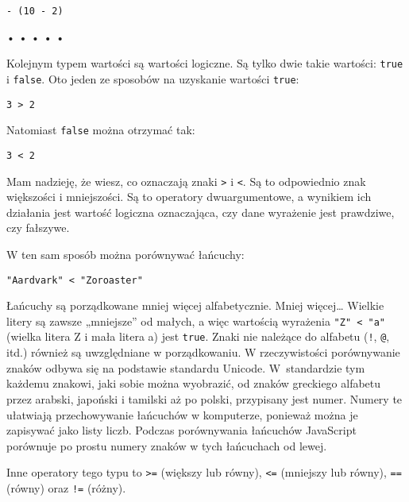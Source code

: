 \begin{verbatim} 
- (10 - 2)
\end{verbatim}
  
\begin{center}
• • • • •
\end{center}
  
    
Kolejnym typem wartości są wartości logiczne. Są tylko dwie takie wartości: \texttt{true} i \texttt{false}. Oto jeden ze sposobów na uzyskanie wartości \texttt{true}:

\begin{verbatim} 
3 > 2
\end{verbatim}
    
Natomiast \texttt{false} można otrzymać tak:

\begin{verbatim} 
3 < 2
\end{verbatim}
    
Mam nadzieję, że wiesz, co oznaczają znaki \texttt{>}\index{>} i \texttt{<}\index{<}. Są to odpowiednio znak większości i mniejszości. Są to operatory dwuargumentowe, a wynikiem ich działania jest wartość logiczna oznaczająca, czy dane wyrażenie jest prawdziwe, czy fałszywe.

    
W ten sam sposób można porównywać łańcuchy:

\begin{verbatim} 
"Aardvark" < "Zoroaster"
\end{verbatim}
    
Łańcuchy są porządkowane mniej więcej alfabetycznie. Mniej więcej… Wielkie litery są zawsze „mniejsze” od małych, a więc wartością wyrażenia \texttt{"Z" < "a"} (wielka litera Z i mała litera a) jest \texttt{true}. Znaki nie należące do alfabetu (\texttt{!}, \texttt{@}, itd.) również są uwzględniane w porządkowaniu. W rzeczywistości porównywanie znaków odbywa się na podstawie standardu Unicode. W~standardzie tym każdemu znakowi, jaki sobie można wyobrazić, od znaków greckiego alfabetu przez arabski, japoński i tamilski aż po polski, przypisany jest numer. Numery te ułatwiają przechowywanie łańcuchów w komputerze, ponieważ można je zapisywać jako listy liczb. Podczas porównywania łańcuchów JavaScript porównuje po prostu numery znaków w tych łańcuchach od lewej.

    
Inne operatory tego typu to \texttt{>=}\index{>=} (większy lub równy), \texttt{<=}\index{<=} (mniejszy lub równy), \texttt{==}\index{==} (równy) oraz \texttt{!=}\index{!=} (różny).

